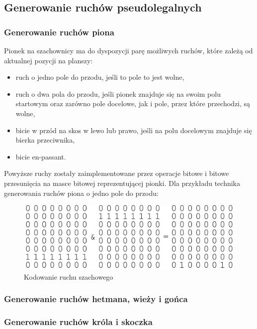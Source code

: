 \subsection{Generowanie ruchów pseudolegalnych}
\label{subsec:generowanie-ruchow-pseudolegalnych}

\subsubsection{Generowanie ruchów piona}

Pionek na szachownicy ma do dyspozycji parę możliwych ruchów, które zależą od aktualnej pozycji na planszy:
\begin{itemize}
    \item ruch o jedno pole do przodu, jeśli to pole to jest wolne,
    \item ruch o dwa pola do przodu, jeśli pionek znajduje się na swoim polu startowym oraz zarówno pole docelowe, jak i pole, przez które przechodzi, są wolne,
    \item bicie w przód na skos w lewo lub prawo, jeśli na polu docelowym znajduje się bierka przeciwnika,
    \item bicie en-passant.
\end{itemize}
Powyższe ruchy zostały zaimplementowane przez operacje bitowe i bitowe przesunięcia na masce bitowej reprezentującej pionki.
Dla przykładu technika generowania ruchów piona o jedno pole do przodu:

\begin{figure}[ht]
    \centering
    \includegraphics[width=0.85\linewidth]{rozdzialy/rozdzial01/3_generowanie-ruchow/rysunki/bitboards-arithmetic}
    \caption{Kodowanie ruchu szachowego}
    \label{fig:bitboards-arithmetic}
\end{figure}


\subsubsection{Generowanie ruchów hetmana, wieży i gońca}

\subsubsection{Generowanie ruchów króla i skoczka}

